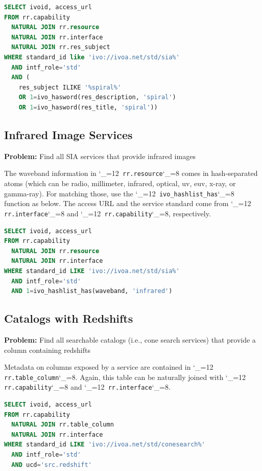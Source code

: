 \documentclass[11pt,a4paper]{ivoa}
\makeatletter
\def\rtent#1{\texttt{\color{rtcolor}\verb|#1|}}
\def\makeunderscoreletter{\catcode`\_=12}
\def\makeunderscoresubscript{\catcode`\_=8}
\def\rtent{\makeunderscoreletter\relax\rt@nt}
\def\rt@nt#1{\texttt{\color{rtcolor} #1}\makeunderscoresubscript{}}
\makeatother
\begin{document}
\begin{lstlisting}[language=SQL,flexiblecolumns=true]
SELECT ivoid, access_url
FROM rr.capability
  NATURAL JOIN rr.resource
  NATURAL JOIN rr.interface
  NATURAL JOIN rr.res_subject
WHERE standard_id like 'ivo://ivoa.net/std/sia%'
  AND intf_role='std'
  AND (
    res_subject ILIKE '%spiral%'
    OR 1=ivo_hasword(res_description, 'spiral')
    OR 1=ivo_hasword(res_title, 'spiral'))
\end{lstlisting}


\subsection{Infrared Image Services}

\textbf{Problem:} Find all SIA services that provide infrared
images

The waveband information in
\rtent{rr.resource}
comes in hash-separated atoms (which can be
radio, millimeter, infrared, optical, uv, euv, x-ray, or gamma-ray).
For matching those, use the \rtent{ivo_hashlist_has} function as
below.  The access URL and the service standard come from
\rtent{rr.interface} and
\rtent{rr.capability}, respectively.


\begin{lstlisting}[language=SQL,flexiblecolumns=true]
SELECT ivoid, access_url
FROM rr.capability
  NATURAL JOIN rr.resource
  NATURAL JOIN rr.interface
WHERE standard_id LIKE 'ivo://ivoa.net/std/sia%'
  AND intf_role='std'
  AND 1=ivo_hashlist_has(waveband, 'infrared')
\end{lstlisting}

\subsection{Catalogs with Redshifts}
\textbf{Problem:} Find all searchable catalogs (i.e., cone search
services) that provide a column containing redshifts

Metadata on columns exposed by a service are contained in
\rtent{rr.table_column}.  Again, this table can be
naturally joined with
\rtent{rr.capability} and
\rtent{rr.interface}.

\begin{lstlisting}[language=SQL,flexiblecolumns=true]
SELECT ivoid, access_url
FROM rr.capability
  NATURAL JOIN rr.table_column
  NATURAL JOIN rr.interface
WHERE standard_id LIKE 'ivo://ivoa.net/std/conesearch%'
  AND intf_role='std'
  AND ucd='src.redshift'
\end{lstlisting}
\end{document}
